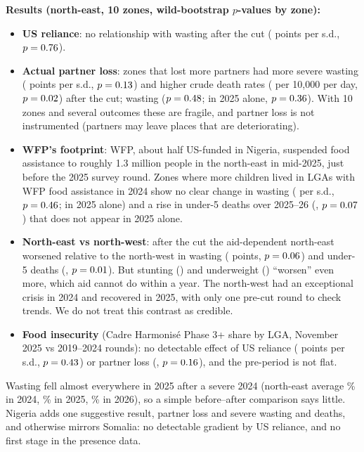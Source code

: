 \documentclass[11pt]{article}
\begin{document}
\textbf{Results (north-east, 10 zones, wild-bootstrap $p$-values by zone):}
\begin{itemize}
  \item \textbf{US reliance}: no relationship with wasting after the cut (\nngBUsGam{} points per s.d., $p=0.76$).
  \item \textbf{Actual partner loss}: zones that lost more partners had more severe wasting (\nngBLossSam{} points per s.d., $p=0.13$) and higher crude death rates (\nngBLossCdr{} per 10,000 per day, $p=0.02$) after the cut; wasting \nngBLossGam{} ($p=0.48$; \nngBLossGamTf{} in 2025 alone, $p=0.36$). With 10 zones and several outcomes these are fragile, and partner loss is not instrumented (partners may leave places that are deteriorating).
  \item \textbf{WFP's footprint}: WFP, about half US-funded in Nigeria, suspended food assistance to roughly 1.3 million people in the north-east in mid-2025, just before the 2025 survey round. Zones where more children lived in LGAs with WFP food assistance in 2024 show no clear change in wasting (\nngBWfpGam{} per s.d., $p=0.46$; \nngBWfpGamTf{} in 2025 alone) and a rise in under-5 deaths over 2025--26 (\nngBWfpUfive, $p=0.07$) that does not appear in 2025 alone.
  \item \textbf{North-east vs north-west}: after the cut the aid-dependent north-east worsened relative to the north-west in wasting (\nngBNeGam{} points, $p=0.06$) and under-5 deaths (\nngBNeUfive, $p=0.01$). But stunting (\nngBNeStunt) and underweight (\nngBNeUwt) ``worsen'' even more, which aid cannot do within a year. The north-west had an exceptional crisis in 2024 and recovered in 2025, with only one pre-cut round to check trends. We do not treat this contrast as credible.
  \item \textbf{Food insecurity} (Cadre Harmonis\'e Phase 3+ share by LGA, November 2025 vs 2019--2024 rounds): no detectable effect of US reliance (\nchBUs{} points per s.d., $p=0.43$) or partner loss (\nchBLoss, $p=0.16$), and the pre-period is not flat.
\end{itemize}
Wasting fell almost everywhere in 2025 after a severe 2024 (north-east average \nngNeGamCACE\% in 2024, \nngNeGamCACF\% in 2025, \nngNeGamCACG\% in 2026), so a simple before--after comparison says little. Nigeria adds one suggestive result, partner loss and severe wasting and deaths, and otherwise mirrors Somalia: no detectable gradient by US reliance, and no first stage in the presence data.
\end{document}

